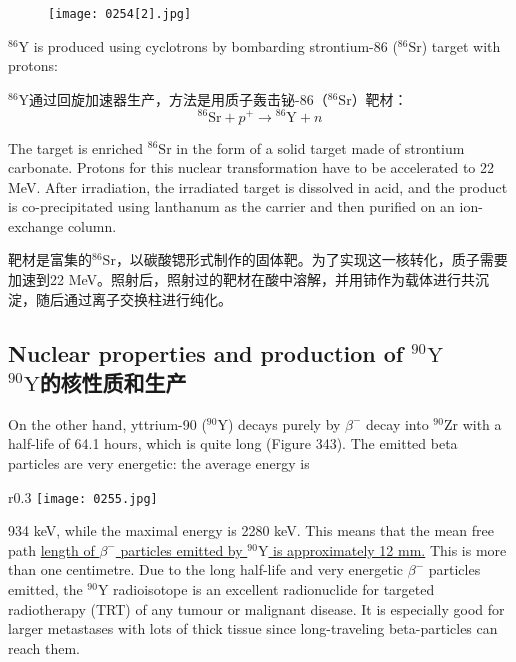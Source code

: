 \documentclass[dvipsnames, svgnames,a4paper,11pt]{article}
\begin{document}
\begin{figure}[h]
	\centering
    \texttt{[image: 0254[2].jpg]}  
     \label{fig342}
\end{figure}

\(\mathrm{^{86}Y}\) is produced using cyclotrons by bombarding strontium-86 (\(\mathrm{^{86}Sr}\)) target with protons:

\(\mathrm{^{86}Y}\)通过回旋加速器生产，方法是用质子轰击铋-86（\(\mathrm{^{86}Sr}\)）靶材：
\[
\mathrm{^{86}Sr} + p^{+} \rightarrow \mathrm{^{86}Y} + n
\]

The target is enriched \(\mathrm{^{86}Sr}\) in the form of a solid target made of strontium carbonate. Protons for this nuclear transformation have to be accelerated to 22 MeV. After irradiation, the irradiated target is dissolved in acid, and the product is co-precipitated using lanthanum as the carrier and then purified on an ion-exchange column.

靶材是富集的\(\mathrm{^{86}Sr}\)，以碳酸锶形式制作的固体靶。为了实现这一核转化，质子需要加速到22 MeV。照射后，照射过的靶材在酸中溶解，并用铈作为载体进行共沉淀，随后通过离子交换柱进行纯化。

\subsection{Nuclear properties and production of \(\mathrm{^{90}Y}\) \\\(\mathrm{^{90}Y}\)的核性质和生产}  

On the other hand, yttrium-90 (\(\mathrm{^{90}Y}\)) decays purely by \(\beta^{-}\) decay into \(\mathrm{^{90}Zr}\) with a half-life of 64.1 hours, which is quite long (Figure 343). The emitted beta particles are very energetic: the average energy is 
\begin{wrapfigure}{r}{0.3\textwidth}
	\centering
    \texttt{[image: 0255.jpg]}  
     \label{fig343}
\end{wrapfigure}
934 keV, while the maximal energy is 2280 keV. This means that the mean free path \underline{length of \(\beta^{-}\) particles emitted by \(\mathrm{^{90}Y}\) is approximately 12 mm.} This is more than one centimetre. Due to the long half-life and very energetic \(\beta^{-}\) particles emitted, the \(\mathrm{^{90}Y}\) radioisotope is an excellent radionuclide for targeted radiotherapy (TRT) of any tumour or malignant disease. It is especially good for larger metastases with lots of thick tissue since long-traveling beta-particles can reach them.
\end{document}
